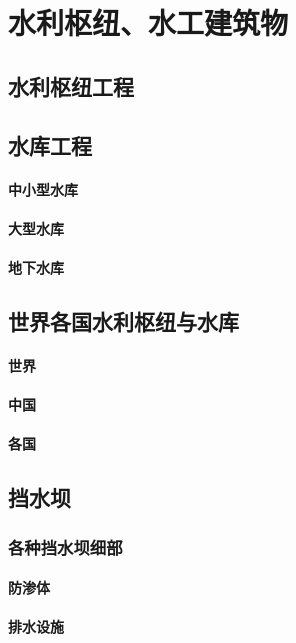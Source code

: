\documentclass[UTF8]{../../ApplicationUniverse}
\begin{document}
\chapter{水利枢纽、水工建筑物}
\section{水利枢纽工程}
\section{水库工程}
    \subsubsection{中小型水库}
    \subsubsection{大型水库}
    \subsubsection{地下水库}
\section{世界各国水利枢纽与水库}
    \subsubsection{世界}
    \subsubsection{中国}
    \subsubsection{各国}
\section{挡水坝}
    \subsection{各种挡水坝细部}
        \subsubsection{防渗体}
        \subsubsection{排水设施}
\end{document}
